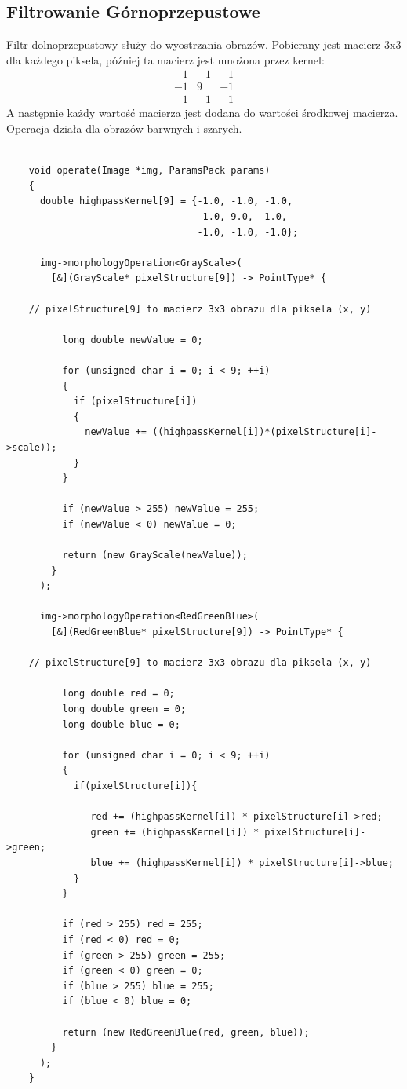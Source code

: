 \documentclass{article}
\begin{document}
\FloatBarrier
\subsection{Filtrowanie Górnoprzepustowe}
Filtr dolnoprzepustowy służy do wyostrzania obrazów. Pobierany jest macierz 3x3 dla każdego piksela, później ta macierz jest mnożona przez kernel:
\begin{equation*}
\begin{matrix}
-1 & -1 & -1 \\
-1 &  9 & -1 \\
-1 & -1 & -1
\end{matrix}
\end{equation*}
A następnie każdy wartość macierza jest dodana do wartości środkowej macierza. 
Operacja działa dla obrazów barwnych i szarych.\\
\begin{Verbatim}[frame=single,label=Filtr Górnoprzepustowy (Source Code)]
    
    void operate(Image *img, ParamsPack params)
    {
      double highpassKernel[9] = {-1.0, -1.0, -1.0, 
                                  -1.0, 9.0, -1.0, 
                                  -1.0, -1.0, -1.0};

      img->morphologyOperation<GrayScale>(
        [&](GrayScale* pixelStructure[9]) -> PointType* {

	// pixelStructure[9] to macierz 3x3 obrazu dla piksela (x, y)

          long double newValue = 0;
          
          for (unsigned char i = 0; i < 9; ++i)
          {
            if (pixelStructure[i])
            {
              newValue += ((highpassKernel[i])*(pixelStructure[i]->scale));
            }
          }
          
          if (newValue > 255) newValue = 255;
          if (newValue < 0) newValue = 0;
          
          return (new GrayScale(newValue));
        }
      );

      img->morphologyOperation<RedGreenBlue>(
        [&](RedGreenBlue* pixelStructure[9]) -> PointType* {

	// pixelStructure[9] to macierz 3x3 obrazu dla piksela (x, y)

          long double red = 0;
          long double green = 0;
          long double blue = 0;

          for (unsigned char i = 0; i < 9; ++i)
          {
            if(pixelStructure[i]){
            
               red += (highpassKernel[i]) * pixelStructure[i]->red;
               green += (highpassKernel[i]) * pixelStructure[i]->green;
               blue += (highpassKernel[i]) * pixelStructure[i]->blue;
            }
          }

          if (red > 255) red = 255;
          if (red < 0) red = 0;
          if (green > 255) green = 255;
          if (green < 0) green = 0;
          if (blue > 255) blue = 255;
          if (blue < 0) blue = 0;
          
          return (new RedGreenBlue(red, green, blue));
        }
      );
    }
    
\end{Verbatim}
\end{document}
